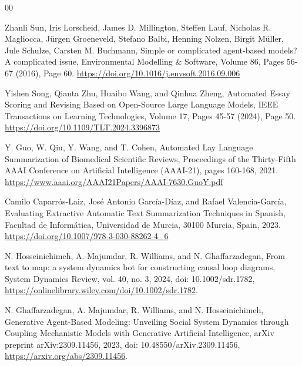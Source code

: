 \documentclass[preprint,12pt]{elsarticle}
\begin{document}
\begin{thebibliography}{00}


Zhanli Sun, Iris Lorscheid, James D. Millington, Steffen Lauf, Nicholas R. Magliocca, Jürgen Groeneveld, Stefano Balbi, Henning Nolzen, Birgit Müller, Jule Schulze, Carsten M. Buchmann,
Simple or complicated agent-based models? A complicated issue,
Environmental Modelling & Software, Volume 86, Pages 56-67 (2016), Page 60.
\href{https://doi.org/10.1016/j.envsoft.2016.09.006}{https://doi.org/10.1016/j.envsoft.2016.09.006}

Yishen Song, Qianta Zhu, Huaibo Wang, and Qinhua Zheng,
Automated Essay Scoring and Revising Based on Open-Source Large Language Models,
IEEE Transactions on Learning Technologies, Volume 17, Pages 45-57 (2024), Page 50.
\href{https://doi.org/10.1109/TLT.2024.3396873}{https://doi.org/10.1109/TLT.2024.3396873}



Y. Guo, W. Qiu, Y. Wang, and T. Cohen,
Automated Lay Language Summarization of Biomedical Scientific Reviews,
Proceedings of the Thirty-Fifth AAAI Conference on Artificial Intelligence (AAAI-21), pages 160-168,
2021.
\href{https://www.aaai.org/AAAI21Papers/AAAI-7630.GuoY.pdf}{https://www.aaai.org/AAAI21Papers/AAAI-7630.GuoY.pdf}

Camilo Caparrós-Laiz, José Antonio García-Díaz, and Rafael Valencia-García,
Evaluating Extractive Automatic Text Summarization Techniques in Spanish,
Facultad de Informática, Universidad de Murcia, 30100 Murcia, Spain,
2023.
\href{https://doi.org/10.1007/978-3-030-88262-4_6}{https://doi.org/10.1007/978-3-030-88262-4_6}

N. Hosseinichimeh, A. Majumdar, R. Williams, and N. Ghaffarzadegan,
From text to map: a system dynamics bot for constructing causal loop diagrams,
System Dynamics Review, vol. 40, no. 3, 2024,
doi: 10.1002/sdr.1782,
\href{https://onlinelibrary.wiley.com/doi/10.1002/sdr.1782}{https://onlinelibrary.wiley.com/doi/10.1002/sdr.1782}.



N. Ghaffarzadegan, A. Majumdar, R. Williams, and N. Hosseinichimeh,
Generative Agent-Based Modeling: Unveiling Social System Dynamics through Coupling Mechanistic Models with Generative Artificial Intelligence,
arXiv preprint arXiv:2309.11456, 2023,
doi: 10.48550/arXiv.2309.11456,
\href{https://arxiv.org/abs/2309.11456}{https://arxiv.org/abs/2309.11456}.



\end{thebibliography}
\end{document}
